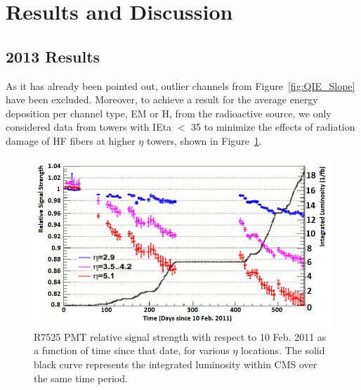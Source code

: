 \section{Results and Discussion}
\subsection{2013 Results}
As it has already been pointed out, outlier channels from Figure~\ref{fig:QIE_Slope} have been excluded.
Moreover, to achieve a result for the average energy deposition per channel type,
EM or H, from the radioactive source, we only considered data from towers with
IEta $<$ 35 to minimize the effects of radiation damage of HF fibers at higher $\eta$ towers, shown in Figure~\ref{fig:PMT_Drift}.
\begin{figure}[htb]
   \begin{center}
      \includegraphics[width=.9\textwidth]{figures/ch_hfcalibration/PMT_Drift.png}
      \caption{R7525 PMT relative signal strength with respect to 10 Feb. 2011 as a
      function of time since that date, for various $\eta$ locations. The solid
      black curve represents the integrated luminosity within CMS over the same
      time period.}
      \label{fig:PMT_Drift}
   \end{center}
\end{figure}

